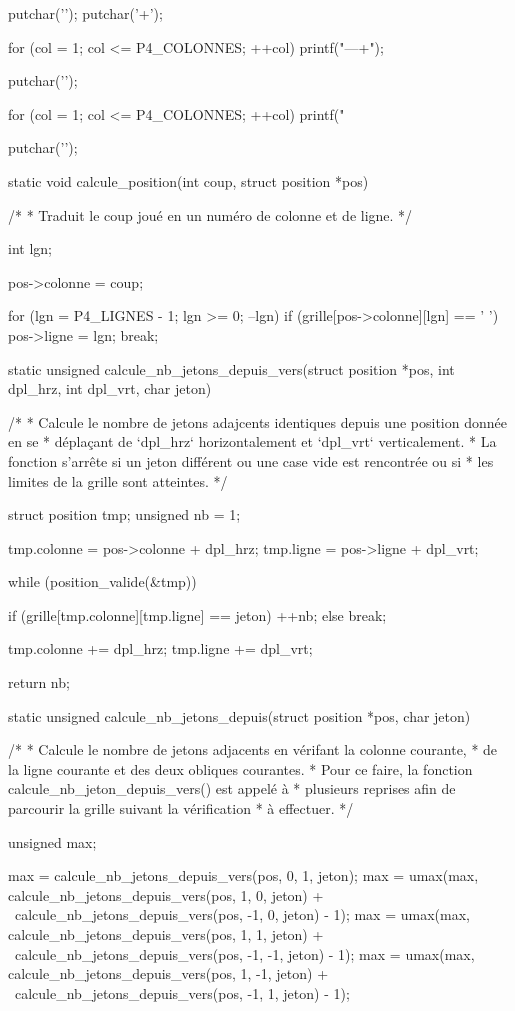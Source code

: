 \begin{C}
{{        putchar('\n');
        putchar('+');

        for (col = 1; col <= P4_COLONNES; ++col)
            printf("---+");

        putchar('\n');
    }

    for (col = 1; col <= P4_COLONNES; ++col)
        printf("  %

    putchar('\n');
}


static void calcule_position(int coup, struct position *pos)
{
    /*
     * Traduit le coup joué en un numéro de colonne et de ligne.
     */

    int lgn;

    pos->colonne = coup;

    for (lgn = P4_LIGNES - 1; lgn >= 0; --lgn)
        if (grille[pos->colonne][lgn] == ' ')
        {
            pos->ligne = lgn;
            break;
        }
}


static unsigned calcule_nb_jetons_depuis_vers(struct position *pos, int dpl_hrz, int dpl_vrt, char jeton)
{
    /*
     * Calcule le nombre de jetons adajcents identiques depuis une position donnée en se
     * déplaçant de `dpl_hrz` horizontalement et `dpl_vrt` verticalement.
     * La fonction s'arrête si un jeton différent ou une case vide est rencontrée ou si
     * les limites de la grille sont atteintes.
     */

    struct position tmp;
    unsigned nb = 1;

    tmp.colonne = pos->colonne + dpl_hrz;
    tmp.ligne = pos->ligne + dpl_vrt;

    while (position_valide(&tmp))
    {
        if (grille[tmp.colonne][tmp.ligne] == jeton)
            ++nb;
        else
            break;

        tmp.colonne += dpl_hrz;
        tmp.ligne += dpl_vrt;
    }

    return nb;
}


static unsigned calcule_nb_jetons_depuis(struct position *pos, char jeton)
{
    /*
     * Calcule le nombre de jetons adjacents en vérifant la colonne courante,
     * de la ligne courante et des deux obliques courantes.
     * Pour ce faire, la fonction calcule_nb_jeton_depuis_vers() est appelé à
     * plusieurs reprises afin de parcourir la grille suivant la vérification
     * à effectuer.
     */

    unsigned max;

    max = calcule_nb_jetons_depuis_vers(pos, 0, 1, jeton);
    max = umax(max, calcule_nb_jetons_depuis_vers(pos, 1, 0, jeton) + \
    calcule_nb_jetons_depuis_vers(pos, -1, 0, jeton) - 1);
    max = umax(max, calcule_nb_jetons_depuis_vers(pos, 1, 1, jeton) + \
    calcule_nb_jetons_depuis_vers(pos, -1, -1, jeton) - 1);
    max = umax(max, calcule_nb_jetons_depuis_vers(pos, 1, -1, jeton) + \
    calcule_nb_jetons_depuis_vers(pos, -1, 1, jeton) - 1);

}
\end{C}
